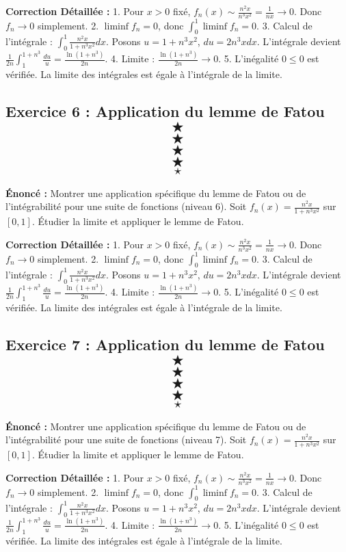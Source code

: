 \documentclass[11pt,a4paper]{article}
\begin{document}
\textbf{Correction Détaillée :}
1. Pour $x > 0$ fixé, $f_n(x) \sim \frac{n^2 x}{n^3 x^2} = \frac{1}{n x} \to 0$. Donc $f_n \to 0$ simplement.
2. $\liminf f_n = 0$, donc $\int_0^1 \liminf f_n = 0$.
3. Calcul de l'intégrale : $\int_0^1 \frac{n^2 x}{1 + n^3 x^2} dx$.
   Posons $u = 1 + n^3 x^2$, $du = 2 n^3 x dx$.
   L'intégrale devient $\frac{1}{2n} \int_1^{1+n^3} \frac{du}{u} = \frac{\ln(1+n^3)}{2n}$.
4. Limite : $\frac{\ln(1+n^3)}{2n} \to 0$.
5. L'inégalité $0 \le 0$ est vérifiée. La limite des intégrales est égale à l'intégrale de la limite.


\subsection*{Exercice 6 : Application du lemme de Fatou $$\bigstar$$$$\bigstar$$$$\bigstar$$$$\bigstar$$$$\star$$}

\textbf{Énoncé :}
Montrer une application spécifique du lemme de Fatou ou de l'intégrabilité pour une suite de fonctions (niveau 6).
Soit $f_n(x) = \frac{n^2 x}{1 + n^3 x^2}$ sur $[0, 1]$.
Étudier la limite et appliquer le lemme de Fatou.

\textbf{Correction Détaillée :}
1. Pour $x > 0$ fixé, $f_n(x) \sim \frac{n^2 x}{n^3 x^2} = \frac{1}{n x} \to 0$. Donc $f_n \to 0$ simplement.
2. $\liminf f_n = 0$, donc $\int_0^1 \liminf f_n = 0$.
3. Calcul de l'intégrale : $\int_0^1 \frac{n^2 x}{1 + n^3 x^2} dx$.
   Posons $u = 1 + n^3 x^2$, $du = 2 n^3 x dx$.
   L'intégrale devient $\frac{1}{2n} \int_1^{1+n^3} \frac{du}{u} = \frac{\ln(1+n^3)}{2n}$.
4. Limite : $\frac{\ln(1+n^3)}{2n} \to 0$.
5. L'inégalité $0 \le 0$ est vérifiée. La limite des intégrales est égale à l'intégrale de la limite.


\subsection*{Exercice 7 : Application du lemme de Fatou $$\bigstar$$$$\bigstar$$$$\bigstar$$$$\bigstar$$$$\star$$}

\textbf{Énoncé :}
Montrer une application spécifique du lemme de Fatou ou de l'intégrabilité pour une suite de fonctions (niveau 7).
Soit $f_n(x) = \frac{n^2 x}{1 + n^3 x^2}$ sur $[0, 1]$.
Étudier la limite et appliquer le lemme de Fatou.

\textbf{Correction Détaillée :}
1. Pour $x > 0$ fixé, $f_n(x) \sim \frac{n^2 x}{n^3 x^2} = \frac{1}{n x} \to 0$. Donc $f_n \to 0$ simplement.
2. $\liminf f_n = 0$, donc $\int_0^1 \liminf f_n = 0$.
3. Calcul de l'intégrale : $\int_0^1 \frac{n^2 x}{1 + n^3 x^2} dx$.
   Posons $u = 1 + n^3 x^2$, $du = 2 n^3 x dx$.
   L'intégrale devient $\frac{1}{2n} \int_1^{1+n^3} \frac{du}{u} = \frac{\ln(1+n^3)}{2n}$.
4. Limite : $\frac{\ln(1+n^3)}{2n} \to 0$.
5. L'inégalité $0 \le 0$ est vérifiée. La limite des intégrales est égale à l'intégrale de la limite.
\end{document}
